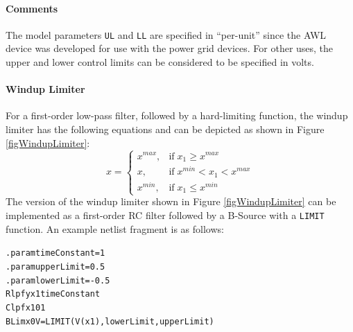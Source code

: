 \paragraph{Comments}
The model parameters \texttt{UL} and \texttt{LL} are specified 
in ``per-unit'' since the AWL device was developed
for use with the power grid devices.  For other uses, the upper
and lower control limits can be considered to be specified in 
volts.

\paragraph{Windup Limiter}
For a first-order low-pass filter, followed by a hard-limiting function,
the windup limiter has the following equations and can be depicted
as shown in Figure \ref{figWindupLimiter}:
\[
x = \left\{ \begin{array}{ll}
x^{max}, &  \mbox{if} \; x_{1} \geq x^{max}\\
x, &  \mbox{if} \; x^{min} < x_{1} < x^{max}\\
x^{min}, & \mbox{if} \; x_{1} \leq x^{min}
\end{array}
\right.
\]
The version of the windup limiter shown in Figure \ref{figWindupLimiter}
can be implemented as a first-order RC filter followed by a B-Source with
a \texttt{LIMIT} function.  An example \Xyce{} netlist fragment is as follows:
\begin{alltt}
.param timeConstant=1
.param upperLimit=0.5
.param lowerLimit=-0.5
Rlpf y x1 {timeConstant}
Clpf x1 0 1
BLim x 0 V={LIMIT(V(x1),lowerLimit,upperLimit)}
\end{alltt}
